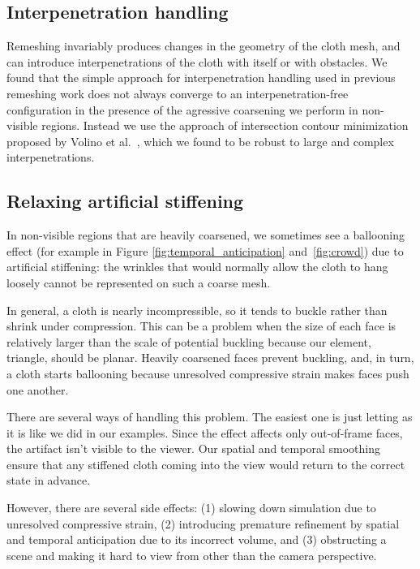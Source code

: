 \documentclass[10pt,journal,compsoc,twoside]{TexInputs/IEEEtran}
\begin{document}
\subsection{Interpenetration handling}

Remeshing invariably produces changes in the geometry of the cloth mesh, and can introduce interpenetrations of the cloth with itself or with obstacles.
We found that the simple approach for interpenetration handling used in previous remeshing work \cite{Narain:2012:AAR} does not always converge to an interpenetration-free configuration in the presence of the agressive coarsening we perform in non-visible regions.
Instead we use the approach of intersection contour minimization proposed by Volino et al.~\cite{Volino:2006:RSC}, which we found to be robust to large and complex interpenetrations.

\subsection{Relaxing artificial stiffening}

In non-visible regions that are heavily coarsened, we sometimes see a ballooning effect
(for example in Figure \ref{fig:temporal_anticipation} and~\ref{fig:crowd}) due to
artificial stiffening: the wrinkles that would normally allow the cloth to hang loosely
cannot be represented on such a coarse mesh.

In general, a cloth is nearly incompressible, so it tends to buckle rather than shrink
under compression.  This can be a problem when the size of each face is
relatively larger than the scale of potential buckling because our element, triangle,
should be planar. Heavily coarsened faces prevent buckling, and, in turn, a cloth starts
ballooning because unresolved compressive strain makes faces push one another.

There are several ways of handling this problem. The easiest one is just letting as it is
like we did in our examples. Since the effect affects only out-of-frame faces, the
artifact isn't visible to the viewer. Our spatial and temporal smoothing ensure that any
stiffened cloth coming into the view would return to the correct state in advance.

However, there are several side effects: (1) slowing down simulation due to unresolved
compressive strain, (2) introducing premature refinement by spatial and temporal
anticipation due to its incorrect volume, and (3) obstructing a scene and making it hard
to view from other than the camera perspective.
\end{document}
